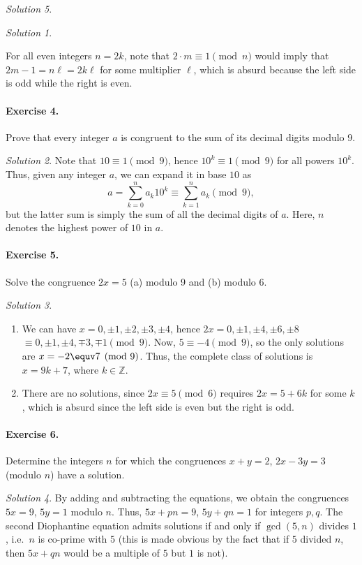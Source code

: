 \documentclass[11pt]{report}
\def\Z{\mathbb{Z}}
\theoremstyle{remark}
\newtheorem*{solution}{Solution}
\begin{document}
\begin{solution}
\begin{solution}
\begin{enumerate}
        For all even integers $n = 2k$, note that $2\cdot m \equiv 1 \pmod{n}$ would
        imply that $2m - 1 = n\ell = 2k\ell$ for some multiplier $\ell$, which is
        absurd because the left side is odd while the right is even.
    \end{enumerate}
    \end{solution}

    \paragraph{Exercise 4.} Prove that every integer $a$ is congruent to the sum of
    its decimal digits modulo 9.
    \begin{solution}
        Note that $10 \equiv 1 \pmod{9}$, hence $10^k \equiv 1 \pmod{9}$ for all
        powers $10^k$. Thus, given any integer $a$, we can expand it in base $10$ as
        \[
            a = \sum_{k = 0}^n a_k 10^k \equiv \sum_{k = 1}^n a_k \pmod{9},
        \] but the latter sum is simply the sum of all the decimal digits of $a$.
        Here, $n$ denotes the highest power of $10$ in $a$.
    \end{solution}
    
    \paragraph{Exercise 5.} Solve the congruence $2x = 5$ (a) modulo 9 and (b) modulo
    6.
    \begin{solution} \mbox{}
    \begin{enumerate}
        \item We can have $x = 0, \pm 1, \pm 2, \pm 3, \pm 4$, hence $2x = 0, \pm 1,
        \pm 4, \pm 6, \pm 8$ $\equiv 0, \pm 1, \pm 4, \mp 3, \mp 1 \pmod{9}$. Now, $5
        \equiv -4 \pmod{9}$, so the only solutions are $x = -2 \equv 7 \pmod{9}$.
        Thus, the complete class of solutions is $x = 9k + 7$, where $k \in \Z$.

        \item There are no solutions, since $2x \equiv 5 \pmod{6}$ requires $2x = 5 +
        6k$ for some $k$, which is absurd since the left side is even but the right
        is odd.
    \end{enumerate}
    \end{solution}
    
    \paragraph{Exercise 6.} Determine the integers $n$ for which the congruences $x +
    y = 2$, $2x - 3y = 3$ (modulo $n$) have a solution.
    \begin{solution}
        By adding and subtracting the equations, we obtain the congruences $5x = 9$,
        $5y = 1$ modulo $n$. Thus, $5x + pn = 9$, $5y + qn = 1$ for integers $p, q$.
        The second Diophantine equation admits solutions if and only if $\gcd(5, n)$
        divides $1$, i.e.\ $n$ is co-prime with $5$ (this is made obvious by the fact
        that if $5$ divided $n$, then $5x + qn$ would be a multiple of $5$ but $1$ is
        not).


\end{solution}
\end{solution}
\end{document}
